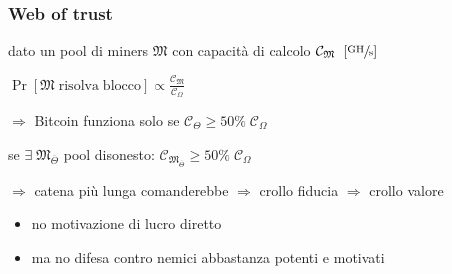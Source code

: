 \begin{frame}
	\frametitle{Web of trust}
	
	dato un pool di miners $\mathfrak{M}$ con capacità di calcolo $\mathcal{C}_\mathfrak{M} \;\;[\sfrac{\mathrm{GH}}{\mathrm{s}}] $ \newline

	$\Pr[\mathfrak{M} \mathrm{\;risolva\;blocco}] \propto \frac{\mathcal{C}_\mathfrak{M}}{\mathcal{C}_{\Omega}} $\newline

	$\Rightarrow$ Bitcoin funziona solo se $\mathcal{C}_{\Theta} \geq 50\%\;\mathcal{C}_{\Omega} $ \newline

	se $\exists\;\mathfrak{M}_{\overline{\Theta}}$ pool disonesto: $\mathcal{C}_{\mathfrak{M}_{\overline{\Theta}}} \geq 50\%\;\mathcal{C}_{\Omega} $ \newline

	$\Rightarrow$ catena più lunga comanderebbe $\Rightarrow$ crollo fiducia $\Rightarrow$ crollo valore \newline
	\begin{itemize}
		\item no motivazione di lucro diretto
		\item ma no difesa contro nemici abbastanza potenti e motivati
	\end{itemize}
	
\end{frame}
